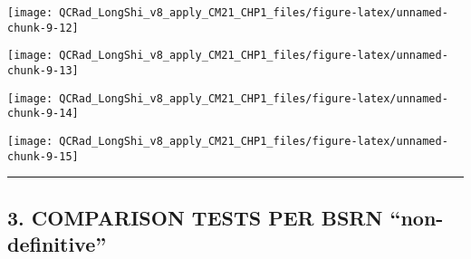 \documentclass[
  10pt,
  a4paper,oneside]{article}
\begin{document}
\begin{center}\texttt{[image: QCRad\_LongShi\_v8\_apply\_CM21\_CHP1\_files/figure-latex/unnamed-chunk-9-12]} \end{center}

\begin{center}\texttt{[image: QCRad\_LongShi\_v8\_apply\_CM21\_CHP1\_files/figure-latex/unnamed-chunk-9-13]} \end{center}

\begin{center}\texttt{[image: QCRad\_LongShi\_v8\_apply\_CM21\_CHP1\_files/figure-latex/unnamed-chunk-9-14]} \end{center}

\begin{center}\texttt{[image: QCRad\_LongShi\_v8\_apply\_CM21\_CHP1\_files/figure-latex/unnamed-chunk-9-15]} \end{center}

\begin{center}\rule{0.5\linewidth}{0.5pt}\end{center}

\newpage

\hypertarget{comparison-tests-per-bsrn-non-definitive}{%
\subsection{3. COMPARISON TESTS PER BSRN ``non-definitive''}\label{comparison-tests-per-bsrn-non-definitive}}
\end{document}
